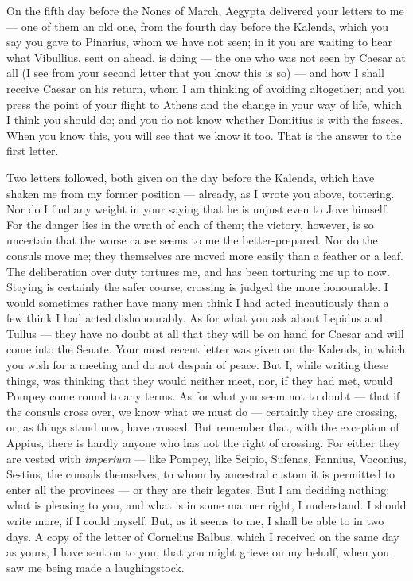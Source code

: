 

 On the fifth day before the Nones of March, Aegypta delivered your letters to me --- one of them an old one, from the fourth day before the Kalends, which you say you gave to Pinarius, whom we have not seen; in it you are waiting to hear what Vibullius, sent on ahead, is doing --- the one who was not seen by Caesar at all (I see from your second letter that you know this is so) --- and how I shall receive Caesar on his return, whom I am thinking of avoiding altogether; and you press the point of your flight to Athens and the change in your way of life, which I think you should do; and you do not know whether Domitius is with the fasces. When you know this, you will see that we know it too. That is the answer to the first letter.

 Two letters followed, both given on the day before the Kalends, which have shaken me from my former position --- already, as I wrote you above, tottering. Nor do I find any weight in your saying that he is unjust even to Jove himself. For the danger lies in the wrath of each of them; the victory, however, is so uncertain that the worse cause seems to me the better-prepared. Nor do the consuls move me; they themselves are moved more easily than a feather or a leaf. The deliberation over duty tortures me, and has been torturing me up to now. Staying is certainly the safer course; crossing is judged the more honourable. I would sometimes rather have many men think I had acted incautiously than a few think I had acted dishonourably. As for what you ask about Lepidus and Tullus --- they have no doubt at all that they will be on hand for Caesar and will come into the Senate. Your most recent letter was given on the Kalends, in which you wish for a meeting and do not despair of peace. But I, while writing these things, was thinking that they would neither meet, nor, if they had met, would Pompey come round to any terms. As for what you seem not to doubt --- that if the consuls cross over, we know what we must do --- certainly they are crossing, or, as things stand now, have crossed. But remember that, with the exception of Appius, there is hardly anyone who has not the right of crossing. For either they are vested with \textit{imperium} --- like Pompey, like Scipio, Sufenas, Fannius, Voconius, Sestius, the consuls themselves, to whom by ancestral custom it is permitted to enter all the provinces --- or they are their legates. But I am deciding nothing; what is pleasing to you, and what is in some manner right, I understand. I should write more, if I could myself. But, as it seems to me, I shall be able to in two days. A copy of the letter of Cornelius Balbus, which I received on the same day as yours, I have sent on to you, that you might grieve on my behalf, when you saw me being made a laughingstock.
